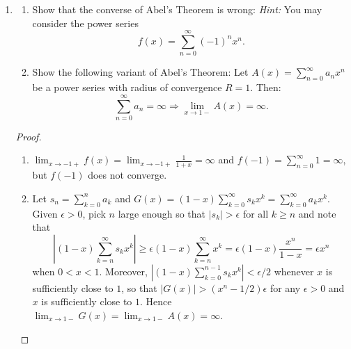 \documentclass{article}
\begin{document}
\begin{enumerate}[font = \Large\bfseries\itshape\space, leftmargin = 3mm, labelsep = 3mm]
\begin{proof}
\textit{Claim:} For $n$ there exists polynomial $p_n$ such that $f^{(n)}(x) = p_n(\frac{1}{x}) e^{-\frac{1}{x^2}}$ if $x \neq 0$, and $f^{(n)}(x) = 0$ if $x = 0$.\\
First, the claim is true for $n = 0$.
If the claim is true for some $n$, i.e. $f^{(n)}(x) = p_n(\frac{1}{x}) e^{-\frac{1}{x^2}}$, then
$f^{(n+1)}(x) = \frac{2}{x^3}p_n(\frac{1}{x}) - \frac{1}{x^2}p_n(\frac{1}{x}) e^{-\frac{1}{x^2}} = p_{n+1}(x) e^{-\frac{1}{x^2}}$ for $x \neq 0$.
By lemma, $\lim_{x\rightarrow 0}f^{(n+1)}(x) = 0$.
Moreover, $f^{(n+1)}(0) = \lim_{x\rightarrow 0} \frac{f^{(n)}(x) - f^{(n)}(0)}{x - 0} = \lim_{x\rightarrow 0} \frac{f^{(n)}(x)}{x} = \lim_{x\rightarrow 0} \frac{p_n(\frac{1}{x})}{x} e^{-\frac{1}{x^2}} = 0$ by lemma.
Therefore, $f^{(n+1)}$ is continuous.
By induction hypothesis, $f \in C^\infty (\mathbb{R})$ and $f^{(n)}(0) = 0$ for any $n \geq 0$.
\end{proof}

\item
\begin{enumerate}[label=(\roman*)]
\item Show that the converse of Abel's Theorem is wrong:
\textit{Hint:} You may consider the power series
$$
f(x) = \sum_{n=0}^\infty (-1)^n x^n.
$$

\item
Show the following variant of Abel's Theorem:
Let $A(x) = \sum_{n=0}^\infty a_nx^n$ be a power series with radius of convergence $R = 1$.
Then:
$$
\sum_{n=0}^\infty a_n = \infty \Rightarrow \lim_{x\rightarrow 1-} A(x) = \infty.
$$
\end{enumerate}

\begin{proof}
\leavevmode
\begin{enumerate}[label = (\roman*)]
\item
$\lim_{x \rightarrow -1+} f(x) = \lim_{x\rightarrow -1+} \frac{1}{1+x} = \infty$ and $f(-1) = \sum_{n=0}^\infty 1 = \infty$,
but $f(-1)$ does not converge.

\item
Let $s_n = \sum_{k=0}^n a_k$ and $G(x) = (1-x) \sum_{k=0}^\infty s_k x^k = \sum_{k=0}^\infty a_k x^k$.
Given $\epsilon > 0$, pick $n$ large enough so that $|s_k| > \epsilon$ for all $k \geq n$ and note that
$$\left| (1-x) \sum_{k=n}^\infty s_k x^k \right| \geq \epsilon (1-x)\sum_{k=n}^\infty x^k = \epsilon (1-x) \frac{x^n}{1-x} = \epsilon x^n$$
when $0 < x < 1$.
Moreover, $|(1-x)\sum_{k=0}^{n-1} s_kx^k| < \epsilon/2$ whenever $x$ is sufficiently close to $1$,
so that $|G(x)| > (x^n -1/2)\epsilon$ for any $\epsilon > 0$ and $x$ is sufficiently close to $1$.
Hence $\lim_{x\rightarrow 1-}G(x) = \lim_{x\rightarrow 1-}A(x) = \infty$.



\end{enumerate}
\end{proof}
\end{enumerate}
\end{document}
